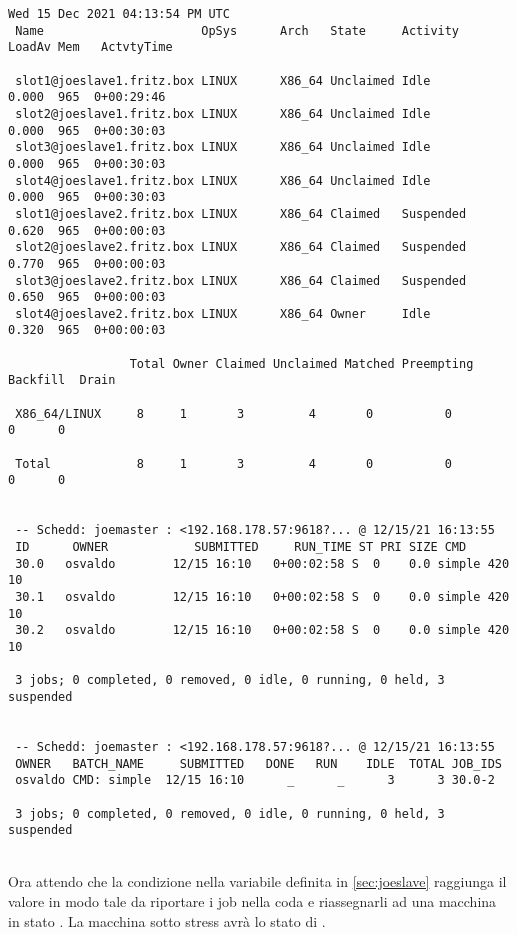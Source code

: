 \begin{lstlisting}[style=output_tiny]
 Wed 15 Dec 2021 04:13:54 PM UTC
 Name                      OpSys      Arch   State     Activity  LoadAv Mem   ActvtyTime
 
 slot1@joeslave1.fritz.box LINUX      X86_64 Unclaimed Idle       0.000  965  0+00:29:46
 slot2@joeslave1.fritz.box LINUX      X86_64 Unclaimed Idle       0.000  965  0+00:30:03
 slot3@joeslave1.fritz.box LINUX      X86_64 Unclaimed Idle       0.000  965  0+00:30:03
 slot4@joeslave1.fritz.box LINUX      X86_64 Unclaimed Idle       0.000  965  0+00:30:03
 slot1@joeslave2.fritz.box LINUX      X86_64 Claimed   Suspended  0.620  965  0+00:00:03
 slot2@joeslave2.fritz.box LINUX      X86_64 Claimed   Suspended  0.770  965  0+00:00:03
 slot3@joeslave2.fritz.box LINUX      X86_64 Claimed   Suspended  0.650  965  0+00:00:03
 slot4@joeslave2.fritz.box LINUX      X86_64 Owner     Idle       0.320  965  0+00:00:03
 
                 Total Owner Claimed Unclaimed Matched Preempting Backfill  Drain
 
 X86_64/LINUX     8     1       3         4       0          0        0      0
 
 Total            8     1       3         4       0          0        0      0
 
 
 -- Schedd: joemaster : <192.168.178.57:9618?... @ 12/15/21 16:13:55
 ID      OWNER            SUBMITTED     RUN_TIME ST PRI SIZE CMD
 30.0   osvaldo        12/15 16:10   0+00:02:58 S  0    0.0 simple 420 10
 30.1   osvaldo        12/15 16:10   0+00:02:58 S  0    0.0 simple 420 10
 30.2   osvaldo        12/15 16:10   0+00:02:58 S  0    0.0 simple 420 10
 
 3 jobs; 0 completed, 0 removed, 0 idle, 0 running, 0 held, 3 suspended
 
 
 -- Schedd: joemaster : <192.168.178.57:9618?... @ 12/15/21 16:13:55
 OWNER   BATCH_NAME     SUBMITTED   DONE   RUN    IDLE  TOTAL JOB_IDS
 osvaldo CMD: simple  12/15 16:10      _      _      3      3 30.0-2
 
 3 jobs; 0 completed, 0 removed, 0 idle, 0 running, 0 held, 3 suspended
\end{lstlisting}
\ \\
Ora attendo che la condizione nella variabile  definita in \autoref{sec:joeslave} raggiunga il valore  in modo tale da riportare i job nella coda e riassegnarli ad una macchina in stato .
La macchina sotto stress avr\`{a} lo stato di .

